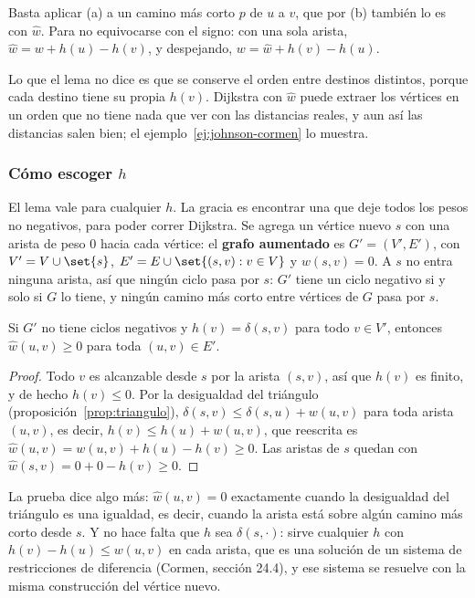 \documentclass[11pt,letterpaper]{article}
\begin{document}
Basta aplicar (a) a un camino más corto $p$ de $u$ a $v$, que por (b)
también lo es con $\hat{w}$. Para no equivocarse con el signo: con una
sola arista, $\hat{w} = w + h(u) - h(v)$, y despejando,
$w = \hat{w} + h(v) - h(u)$.

Lo que el lema no dice es que se conserve el orden entre destinos
distintos, porque cada destino tiene su propia $h(v)$. Dijkstra con
$\hat{w}$ puede extraer los vértices en un orden que no tiene nada que
ver con las distancias reales, y aun así las distancias salen bien; el
ejemplo~\ref{ej:johnson-cormen} lo muestra.

\subsubsection*{Cómo escoger $h$}

El lema vale para cualquier $h$. La gracia es encontrar una que deje
todos los pesos no negativos, para poder correr Dijkstra. Se agrega un
vértice nuevo $s$ con una arista de peso $0$ hacia cada vértice: el
\textbf{grafo aumentado} es $G' = (V', E')$, con $V' = V \cup \set{s}$,
$E' = E \cup \set{(s, v) : v \in V}$ y $w(s, v) = 0$. A $s$ no entra
ninguna arista, así que ningún ciclo pasa por $s$: $G'$ tiene un ciclo
negativo si y solo si $G$ lo tiene, y ningún camino más corto entre
vértices de $G$ pasa por $s$.

\begin{proposicion}
  \label{prop:johnson-no-negativos}
  Si $G'$ no tiene ciclos negativos y $h(v) = \delta(s, v)$ para todo
  $v \in V'$, entonces $\hat{w}(u, v) \ge 0$ para toda
  $(u, v) \in E'$.
\end{proposicion}

\begin{proof}
  Todo $v$ es alcanzable desde $s$ por la arista $(s, v)$, así que
  $h(v)$ es finito, y de hecho $h(v) \le 0$. Por la desigualdad del
  triángulo (proposición~\ref{prop:triangulo}),
  $\delta(s, v) \le \delta(s, u) + w(u, v)$ para toda arista $(u, v)$,
  es decir, $h(v) \le h(u) + w(u, v)$, que reescrita es
  $\hat{w}(u, v) = w(u, v) + h(u) - h(v) \ge 0$. Las aristas de $s$
  quedan con $\hat{w}(s, v) = 0 + 0 - h(v) \ge 0$.
\end{proof}

La prueba dice algo más: $\hat{w}(u, v) = 0$ exactamente cuando la
desigualdad del triángulo es una igualdad, es decir, cuando la arista
está sobre algún camino más corto desde $s$. Y no hace falta que $h$
sea $\delta(s, \cdot)$: sirve cualquier $h$ con
$h(v) - h(u) \le w(u, v)$ en cada arista, que es una solución de un
sistema de restricciones de diferencia (Cormen, sección 24.4), y ese
sistema se resuelve con la misma construcción del vértice nuevo.
\end{document}
